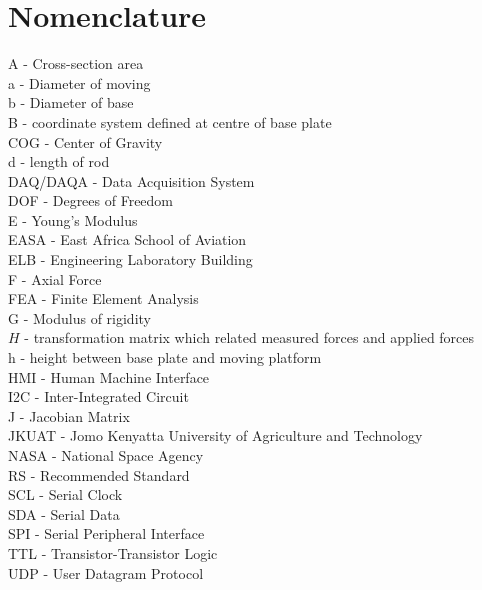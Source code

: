 \section*{Nomenclature}
    A - Cross-section area\\
    a - Diameter of moving\\
    b - Diameter of base\\
    B - coordinate system defined at centre of base plate\\
    COG - Center of Gravity\\
    d - length of rod\\
    DAQ/DAQA - Data Acquisition System\\
    DOF - Degrees of Freedom\\
    E - Young's Modulus\\
    EASA - East Africa School of Aviation\\
    ELB - Engineering Laboratory Building\\
    F - Axial Force\\
    FEA - Finite Element Analysis\\
    G - Modulus of rigidity\\
    $H$ - transformation matrix which related measured forces and applied forces\\
    h - height between base plate and moving platform\\
    HMI - Human Machine Interface\\
    I2C - Inter-Integrated Circuit\\
    J - Jacobian Matrix\\
    JKUAT - Jomo Kenyatta University of Agriculture and Technology\\
    NASA - National Space Agency\\
    RS - Recommended Standard\\
    SCL - Serial Clock\\
    SDA - Serial Data\\
    SPI - Serial Peripheral Interface\\
    TTL - Transistor-Transistor Logic\\
    UDP - User Datagram Protocol
